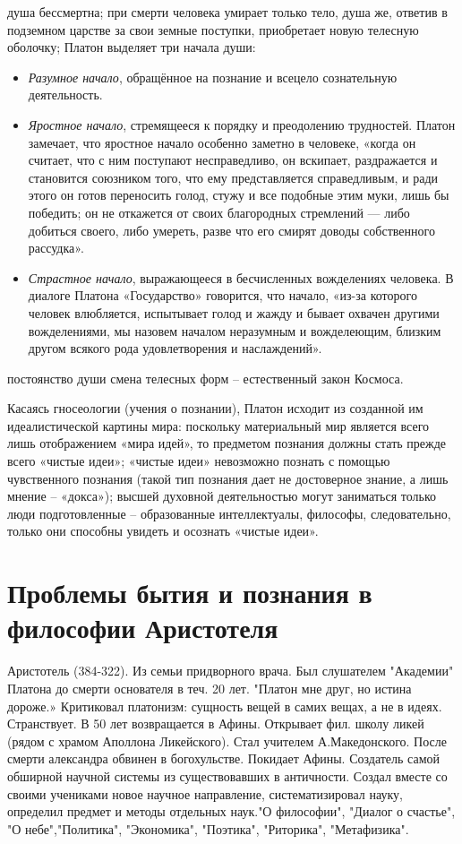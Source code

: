 \documentclass[12pt]{article}
\begin{document}
\begin{enumerate}
\begin{itemize}
		душа бессмертна;
		при смерти человека умирает только тело, душа же, ответив в подземном царстве за свои земные поступки,
		приобретает новую телесную оболочку;
		Платон выделяет три начала души:
		\begin{itemize}
		\item \textit{Разумное начало}, обращённое на познание и всецело сознательную деятельность.
		\item \textit{Яростное начало}, стремящееся к порядку и преодолению трудностей.
			Платон замечает, что яростное начало особенно заметно в человеке,
			«когда он считает, что с ним поступают несправедливо, он вскипает, раздражается и становится союзником того,
			что ему представляется справедливым, и ради этого он готов переносить голод, стужу и все подобные этим муки,
			лишь бы победить; он не откажется от своих благородных стремлений — либо добиться своего, либо умереть,
			разве что его смирят доводы собственного рассудка».
		\item \textit{Страстное начало}, выражающееся в бесчисленных вожделениях человека.
			В диалоге Платона «Государство» говорится, что начало, «из-за которого человек влюбляется,
			испытывает голод и жажду и бывает охвачен другими вожделениями, мы назовем началом неразумным и вожделеющим,
			близким другом всякого рода удовлетворения и наслаждений».
		\end{itemize}
	постоянство души смена телесных форм – естественный закон Космоса.
	\end{itemize}
\end{enumerate}
Касаясь гносеологии (учения о познании), Платон исходит из созданной им идеалистической картины мира:
поскольку материальный мир является всего лишь отображением «мира идей», то предметом познания должны
стать прежде всего «чистые идеи»; «чистые идеи» невозможно познать с помощью чувственного познания
(такой тип познания дает не достоверное знание, а лишь мнение – «докса»); высшей духовной деятельностью
могут заниматься только люди подготовленные – образованные интеллектуалы, философы, следовательно,
только они способны увидеть и осознать «чистые идеи».


\newpage
\section{Проблемы бытия и познания в философии Аристотеля}
Аристотель (384-322). Из семьи придворного врача. Был слушателем "Академии" Платона до смерти основателя
в теч. 20 лет. "Платон мне друг, но истина дороже.» Критиковал платонизм: сущность вещей в самих вещах, а не
в идеях. Странствует. В 50 лет возвращается в Афины. Открывает фил. школу ликей (рядом с храмом Аполлона
Ликейского). Стал учителем А.Македонского. После смерти александра обвинен в богохульстве. Покидает Афины.
Создатель самой обширной научной системы из существовавших в античности. Создал вместе со своими учениками новое
научное направление, систематизировал науку, определил предмет и методы отдельных наук."О философии", "Диалог о
счастье", "О небе","Политика", "Экономика", "Поэтика", "Риторика", "Метафизика".
\end{document}
